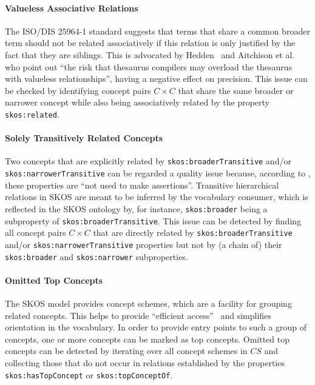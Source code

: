 \paragraph{Valueless Associative Relations}

The ISO/DIS 25964-1 standard \cite{ISO25964-1:2011} suggests that terms that share a common broader term should not be related associatively if this relation is only justified by the fact that they are siblings. This is advocated by Hedden~\cite{Hedden2010} and Aitchison et al.~\cite{Aitchison2000} who point out ``the risk that thesaurus compilers may overload the thesaurus with valueless relationships'', having a negative effect on precision.
This issue can be checked by identifying concept pairs $C \times C$ that share the same broader or narrower concept while also being associatively related by the property \texttt{skos:related}.

\paragraph{Solely Transitively Related Concepts}

Two concepts that are explicitly related by \texttt{skos:broaderTransitive} and/or \texttt{skos:narrowerTransitive} can be regarded a quality issue because, according to \cite{SkosReference2008}, these properties are ``not used to make assertions''. Transitive hierarchical relations in SKOS are meant to be inferred by the vocabulary consumer, which is reflected in the SKOS ontology by, for instance, \texttt{skos:broader} being a subproperty of \texttt{skos:broaderTransitive}. 
This issue can be detected by finding all concept pairs $C \times C$ that are directly related by \texttt{skos:broaderTransitive} and/or \texttt{skos:narrowerTransitive} properties but not by (a chain of) their \texttt{skos:broader} and \texttt{skos:narrower} subproperties.

\paragraph{Omitted Top Concepts}

The SKOS model provides concept schemes, which are a facility for grouping related concepts. This helps to provide ``efficient access''~\cite{Isaac2009} and simplifies orientation in the vocabulary. In order to provide entry points to such a group of concepts, one or more concepts can be marked as top concepts.  
Omitted top concepts can be detected by iterating over all concept schemes in $CS$ and collecting those that do not occur in relations established by the properties \texttt{skos:hasTopConcept} or \texttt{skos:topConceptOf}.

